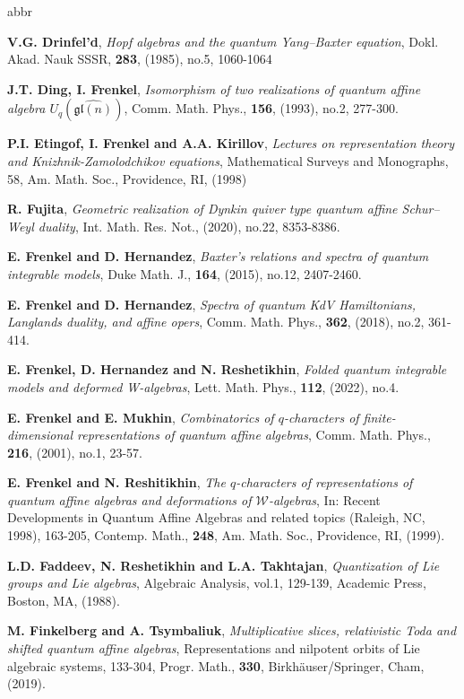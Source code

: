 \documentclass[11pt]{amsart}
\theoremstyle{definition}
\theoremstyle{remark}
\numberwithin{equation}{section}
\begin{document}
\begin{thebibliography}{abbr}
{ {\bf V.G. Drinfel'd}, {\it Hopf algebras and the quantum Yang--Baxter equation}, {Dokl. Akad. Nauk SSSR, \textbf{283}, (1985), no.5, 1060-1064}

 {\bf J.T. Ding, I. Frenkel}, {\it Isomorphism of two realizations of quantum affine algebra $U_q(\widehat{\mathfrak{gl}(n)})$}, Comm. Math. Phys., \textbf{156}, (1993), no.2, 277-300.

 {\bf P.I. Etingof, I. Frenkel and A.A. Kirillov}, {\it Lectures on representation theory and Knizhnik-Zamolodchikov equations}, Mathematical Surveys and Monographs, 58, {Am. Math. Soc., Providence, RI, (1998)}

 {\bf R. Fujita}, {\it Geometric realization of Dynkin quiver type quantum affine Schur–Weyl duality}, Int. Math. Res. Not., (2020), no.22, 8353-8386.

 {\bf E. Frenkel and D. Hernandez}, {\it Baxter’s relations and spectra of quantum integrable models}, Duke Math. J., \textbf{164}, (2015), no.12, 2407-2460.

 {\bf E. Frenkel and D. Hernandez}, {\it Spectra of quantum KdV Hamiltonians, Langlands duality, and affine opers}, Comm. Math. Phys., \textbf{362}, (2018), no.2, 361-414.

 {\bf E. Frenkel, D. Hernandez and N. Reshetikhin}, {\it Folded quantum integrable models and deformed W-algebras}, Lett. Math. Phys., \textbf{112}, (2022), no.4.

 {\bf E. Frenkel and E. Mukhin}, {\it Combinatorics of $q$-characters of finite-dimensional representations of quantum affine algebras}, Comm. Math. Phys., \textbf{216}, (2001), no.1, 23-57.

 {\bf E. Frenkel and N. Reshitikhin}, {\it The $ q $-characters of representations of quantum affine algebras and deformations of $\mathcal {W} $-algebras}, In: Recent Developments in Quantum Affine Algebras and related topics (Raleigh, NC, 1998), 163-205, Contemp. Math., \textbf{248}, Am. Math. Soc., Providence, RI, (1999).

 {\bf L.D. Faddeev, N. Reshetikhin and L.A. Takhtajan}, {\it Quantization of Lie groups and Lie
algebras}, Algebraic Analysis, vol.1, 129-139, Academic Press, Boston, MA, (1988).

 {\bf M. Finkelberg and A. Tsymbaliuk}, {\it Multiplicative slices, relativistic Toda and shifted quantum affine
algebras}, Representations and nilpotent orbits of Lie algebraic systems, 133-304, Progr. Math., \textbf{330}, Birkhäuser/Springer, Cham, (2019).

}
\end{thebibliography}
\end{document}
